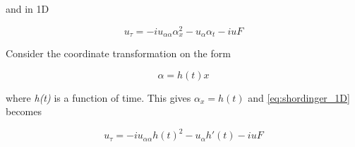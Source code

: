 \documentclass{article}
\begin{document}
and in 1D 

\begin{equation}\label{eq:shordinger_1D}
u_\tau = -iu_{\alpha \alpha} \alpha^2_x  -  u_\alpha \alpha_t - iuF
\end{equation}

Consider the coordinate transformation on the form 

\begin{equation}\label{eq:x_alpha}
\alpha = h(t) x
\end{equation}

where \textit{h(t)} is a function of time. This gives $\alpha_x = h(t)$ and \eqref{eq:shordinger_1D} becomes 

\begin{equation}
u_\tau = -iu_{\alpha \alpha} h(t)^2  -  u_\alpha h'(t) - iuF
\end{equation}
\end{document}
